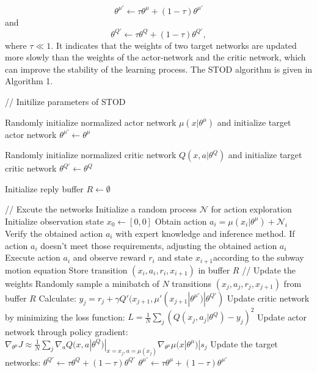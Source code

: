 \documentclass[journal]{IEEEtran}
\begin{document}
\begin{equation}
\theta^{\mu'} \leftarrow \tau \theta^{\mu} + (1-\tau)\theta^{\mu'}
\end{equation}
and
\begin{equation}
\theta^{Q'} \leftarrow \tau \theta^{Q} + (1-\tau)\theta^{Q'},
\end{equation}
where \(\tau \ll 1\). It indicates that the weights of two target networks are updated more slowly than the weights of the actor-network and the critic network, which can improve the stability of the learning process. The STOD algorithm is given in Algorithm 1.

\begin{algorithm}
	\caption{\quad STOD algorithm}
	// Initilize parameters of STOD
	\par Randomly initialize normalized actor network \(\mu(x|\theta^{\mu})\) and initialize target actor network \(\theta^{\mu'} \leftarrow \theta^{\mu} \)
	\par Randomly initialize normalized critic network \(Q(x,a|\theta^{Q})\) and initialize target critic network \(\theta^{Q'} \leftarrow \theta^{Q} \)
	\par Initialize reply buffer \(R \leftarrow \emptyset\)
	\begin{algorithmic}
    \STATE // Excute the networks 
    \STATE  Initialize a random process \(\mathcal{N}\) for action exploration 
	\STATE  Initialize observation state \(x_0 \leftarrow [0,0]\) 
    \STATE Obtain action \(a_i=\mu(x_i|\theta^{\mu}) + \mathcal{N}_i\)
    \STATE Verify the obtained action \(a_i\) with expert knowledge and inference method. If action \(a_i\) doesn't meet those requirements, adjusting the obtained action \(a_i\) 
    \STATE Execute action \(a_i\) and observe reward \(r_i\) and state \(x_{i+1}\)according to the subway motion equation 
    \STATE Store transition \((x_i,a_i,r_i,x_{i+1})\) in buffer \(R\)
    \STATE // Update the weights 
    \STATE  Randomly sample a minibatch of \(N\) transitions \((x_j,a_j,r_j,x_{j+1})\) from buffer \(R\)
    \STATE Calculate:
    \(y_j=r_j + \gamma Q'(x_{j+1},\mu'(x_{j+1}|\theta^{\mu'})|\theta^{Q'})\)
    \STATE Update critic network by minimizing the loss function:
    \STATE
    \(L =\frac{1}{N}\sum_{j}(Q(x_j,a_j|\theta^Q)-y_j)^2\)
    \STATE Update actor network through policy gradient:
    \STATE
    \(\nabla_{\theta^\mu} J\approx \frac{1}{N} \sum_{j} \nabla_aQ(x,a|\theta^Q)|_{x=x_j,a=\mu(x_j)} 
    \nabla_{\theta^\mu}\mu(x|\theta^{\mu})|s_j \)
    \STATE Update the target networks:
    \STATE
    \(\theta^{Q'} \leftarrow \tau \theta^{Q} + (1-\tau)\theta^{Q'}\)
    \STATE
    \(\theta^{\mu'} \leftarrow \tau \theta^{\mu} + (1-\tau)\theta^{\mu'}\)
    \ENDFOR
    \ENDFOR
    \end{algorithmic}
\end{algorithm} 
\end{document}
